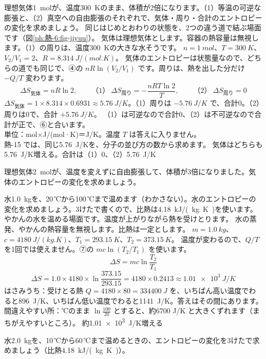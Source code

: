 \label{ph:熱-6:ex4}
\begin{phreidai}
理想気体\qty{1}{mol}が、温度\qty{300}{K}のまま、体積が2倍になります。（1）等温の可逆な膨張と、（2）真空への自由膨張のそれぞれで、気体・周り・合計のエントロピーの変化を求めましょう。
\phbamen
同じはじめとおわりの状態を、2つの違う道で結ぶ場面です（図\ref{ph:熱-6:fig-jiyuu}）。
\phmushi
気体は理想気体とします。容器の熱容量は無視します。（1）の周りは、温度\qty{300}{K}の大きな水そうです。
\phzu
$n=\qty{1}{mol}$、$T=\qty{300}{K}$、$V_2/V_1=2$、$R=\qty{8.314}{J/(mol.K)}$。
\phriyu
気体のエントロピーは状態量なので、どちらの道でも同じで、④の $nR\ln(V_2/V_1)$ です。周りは、熱を出した分だけ $-Q/T$ 変わります。
\phtateru
\[\Delta S_{\text{気体}}=nR\ln2,\qquad\text{（1）}\ \Delta S_{\text{周り}}=-\frac{nRT\ln2}{T},\qquad\text{（2）}\ \Delta S_{\text{周り}}=0\]
\phtoku
$\Delta S_{\text{気体}}=1\times8.314\times0.6931\approx\qty{5.76}{J/K}$。（1）周りは $\qty{-5.76}{J/K}$ で、合計0。（2）周りは0で、合計 $+\qty{5.76}{J/K}$。
\phtashikame
（1）は可逆なので合計0、（2）は不可逆なので合計が正で、⑥と合います。\\
単位：mol×J/(mol·K)＝J/K。温度 $T$ は答えに入りません。\\
熱-15 では、同じ\qty{5.76}{J/K}を、分子の並び方の数から求めます。
\kotae 気体はどちらも\qty{5.76}{J/K}増える。合計は（1）0、（2）\qty{5.76}{J/K}
\end{phreidai}
\begin{jibun}
理想気体\qty{2}{mol}が、温度を変えずに自由膨張して、体積が3倍になりました。気体のエントロピーの変化を求めましょう。
\end{jibun}

\label{ph:熱-6:ex5}
\begin{phreidai}[やかんの水を温めるときのエントロピー]
水\qty{1.0}{kg}を、20\,℃から100\,℃まで温めます（わかさない）。水のエントロピーの変化を求めましょう。3けたで書くので、比熱は\qty{4.18}{kJ/(kg.K)}を使います。
\phbamen
やかんの水を温める場面です。温度が上がりながら熱を受けとります。
\phmushi
水の蒸発、やかんの熱容量を無視します。比熱は一定とします。
\phzu
$m=\qty{1.0}{kg}$、$c=\qty{4180}{J/(kg.K)}$、$T_1=\qty{293.15}{K}$、$T_2=\qty{373.15}{K}$。
\phriyu
温度が変わるので、$Q/T$ を1回では使えません。⑦の $mc\ln(T_2/T_1)$ を使います。
\phtateru
\[\Delta S=mc\ln\frac{T_2}{T_1}\]
\phtoku
\[\Delta S=1.0\times4180\times\ln\frac{373.15}{293.15}=4180\times0.2413\approx\qty{1.01e3}{J/K}\]
\phtashikame
はさみうち：受けとる熱 $Q=4180\times80=\qty{334400}{J}$ を、いちばん高い温度でわると\qty{896}{J/K}、いちばん低い温度でわると\qty{1141}{J/K}。答えはその間にあります。\\
間違えやすい所：℃のまま $\ln\tfrac{100}{20}$ とすると、約6700 J/K と大きくずれます（まちがえやすいところ）。
\kotae 約\qty{1.01e3}{J/K}増える
\end{phreidai}
\begin{jibun}
水\qty{2.0}{kg}を、10\,℃から60\,℃まで温めるときの、エントロピーの変化を3けたで求めましょう（比熱\qty{4.18}{kJ/(kg.K)}）。
\end{jibun}

